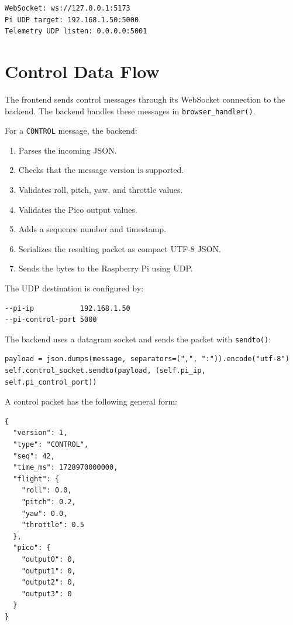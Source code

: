 \documentclass[11pt]{article}
\begin{document}
\begin{lstlisting}
WebSocket: ws://127.0.0.1:5173
Pi UDP target: 192.168.1.50:5000
Telemetry UDP listen: 0.0.0.0:5001
\end{lstlisting}

\section{Control Data Flow}

The frontend sends control messages through its WebSocket connection to the
backend. The backend handles these messages in
\texttt{browser\_handler()}.

For a \texttt{CONTROL} message, the backend:

\begin{enumerate}[leftmargin=*]
    \item Parses the incoming JSON.
    \item Checks that the message version is supported.
    \item Validates roll, pitch, yaw, and throttle values.
    \item Validates the Pico output values.
    \item Adds a sequence number and timestamp.
    \item Serializes the resulting packet as compact UTF-8 JSON.
    \item Sends the bytes to the Raspberry Pi using UDP.
\end{enumerate}

The UDP destination is configured by:

\begin{lstlisting}
--pi-ip           192.168.1.50
--pi-control-port 5000
\end{lstlisting}

The backend uses a datagram socket and sends the packet with
\texttt{sendto()}:

\begin{lstlisting}
payload = json.dumps(message, separators=(",", ":")).encode("utf-8")
self.control_socket.sendto(payload, (self.pi_ip, self.pi_control_port))
\end{lstlisting}

A control packet has the following general form:

\begin{lstlisting}
{
  "version": 1,
  "type": "CONTROL",
  "seq": 42,
  "time_ms": 1728970000000,
  "flight": {
    "roll": 0.0,
    "pitch": 0.2,
    "yaw": 0.0,
    "throttle": 0.5
  },
  "pico": {
    "output0": 0,
    "output1": 0,
    "output2": 0,
    "output3": 0
  }
}
\end{lstlisting}
\end{document}
